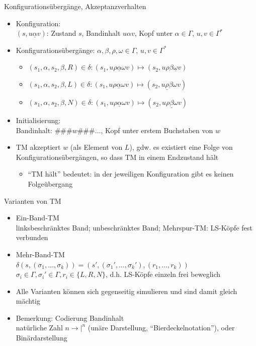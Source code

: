 \begin{frame}{Konfigurationsübergänge, Akzeptanzverhalten}
	\begin{itemize}
		\item Konfiguration:\\
		$(s, u\underline{\alpha}v)$: Zustand $s$, Bandinhalt $u\alpha v$, Kopf unter $\alpha \in \Gamma$, $u,v \in \Gamma^*$
		\item Konfigurationsübergänge: $\alpha, \beta, \rho, \omega \in \Gamma$, $u, v \in \Gamma^*$
		\begin{itemize}
			\item $(s_1, \alpha, s_2, \beta, R) \in \delta:$\qquad $(s_1, u\rho\underline{\alpha}\omega v) \mapsto (s_2, u\rho\beta\underline{\omega}v)$
			\item $(s_1, \alpha, s_2, \beta, L) \in \delta:$\qquad $(s_1, u\rho\underline{\alpha}\omega v) \mapsto (s_2, u\underline{\rho}\beta\omega v)$
			\item $(s_1, \alpha, s_2, \beta, N) \in \delta:$\qquad $(s_1, u\rho\underline{\alpha}\omega v) \mapsto (s_2, u\rho\underline{\beta}\omega v)$
		\end{itemize}
		\item Initialisierung:\\
		Bandinhalt: $\#\#\# w\#\#\#\ldots$, Kopf unter erstem Buchstaben von $w$
		\item TM akzeptiert $w$ (als Element von $L$), gdw. es existiert eine Folge von Konfigurationsübergängen, so dass TM in einem Endzustand hält
		\begin{itemize}
			\item "`TM hält"' bedeutet: in der jeweiligen Konfiguration gibt es keinen Folgeübergang
		\end{itemize}
	\end{itemize}
\end{frame}

\begin{frame}{Varianten von TM}
	\begin{itemize}
		\item Ein-Band-TM\\
		linksbeschränktes Band; unbeschränktes Band; Mehrspur-TM: LS-Köpfe fest verbunden
		\item Mehr-Band-TM\\
		$\delta(s, (\sigma_1, \ldots, \sigma_k)) = (s', (\sigma_1', \ldots, \sigma_k'),(r_1,\ldots,r_k))$\\
		$\sigma_i \in \Gamma, \sigma_i' \in \Gamma, r_i \in \{L, R, N\}$, d.h. LS-Köpfe einzeln frei beweglich
		\item Alle Varianten können sich gegenseitig simulieren und sind damit gleich mächtig
		\item Bemerkung: Codierung Bandinhalt\\
		natürliche Zahl $n \rightarrow |^n$ (unäre Darstellung, "`Bierdeckelnotation"'), oder Binärdarstellung
	\end{itemize}
\end{frame}

